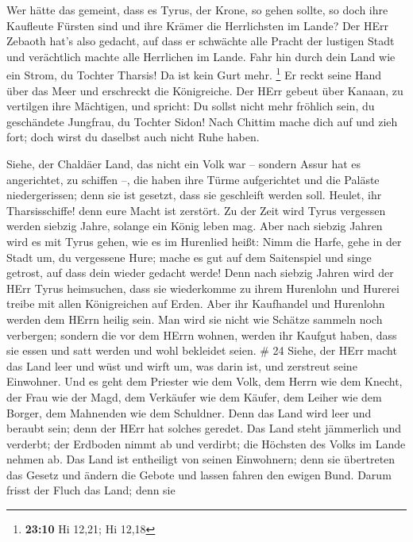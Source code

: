  Wer hätte das gemeint, dass es Tyrus, der Krone, so gehen
sollte, so doch ihre Kaufleute Fürsten sind und ihre Krämer die
Herrlichsten im Lande?  Der HErr Zebaoth hat's also gedacht,
auf dass er schwächte alle Pracht der lustigen Stadt und verächtlich
machte alle Herrlichen im Lande.  Fahr hin durch dein Land
wie ein Strom, du Tochter Tharsis! Da ist kein Gurt mehr. \footnote{\textbf{23:10}
  Hi 12,21; Hi 12,18}  Er reckt seine Hand über das Meer
und erschreckt die Königreiche. Der HErr gebeut über Kanaan, zu
vertilgen ihre Mächtigen,  und spricht: Du sollst nicht
mehr fröhlich sein, du geschändete Jungfrau, du Tochter Sidon! Nach
Chittim mache dich auf und zieh fort; doch wirst du daselbst auch nicht
Ruhe haben.

 Siehe, der Chaldäer Land, das nicht ein Volk war --
sondern Assur hat es angerichtet, zu schiffen --, die haben ihre Türme
aufgerichtet und die Paläste niedergerissen; denn sie ist gesetzt, dass
sie geschleift werden soll.  Heulet, ihr Tharsisschiffe!
denn eure Macht ist zerstört.  Zu der Zeit wird Tyrus
vergessen werden siebzig Jahre, solange ein König leben mag. Aber nach
siebzig Jahren wird es mit Tyrus gehen, wie es im Hurenlied heißt:
 Nimm die Harfe, gehe in der Stadt um, du vergessene Hure;
mache es gut auf dem Saitenspiel und singe getrost, auf dass dein wieder
gedacht werde!  Denn nach siebzig Jahren wird der HErr
Tyrus heimsuchen, dass sie wiederkomme zu ihrem Hurenlohn und Hurerei
treibe mit allen Königreichen auf Erden.  Aber ihr
Kaufhandel und Hurenlohn werden dem HErrn heilig sein. Man wird sie
nicht wie Schätze sammeln noch verbergen; sondern die vor dem HErrn
wohnen, werden ihr Kaufgut haben, dass sie essen und satt werden und
wohl bekleidet seien. \# 24  Siehe, der HErr macht das Land
leer und wüst und wirft um, was darin ist, und zerstreut seine
Einwohner.  Und es geht dem Priester wie dem Volk, dem Herrn
wie dem Knecht, der Frau wie der Magd, dem Verkäufer wie dem Käufer, dem
Leiher wie dem Borger, dem Mahnenden wie dem Schuldner. 
Denn das Land wird leer und beraubt sein; denn der HErr hat solches
geredet.  Das Land steht jämmerlich und verderbt; der
Erdboden nimmt ab und verdirbt; die Höchsten des Volks im Lande nehmen
ab.  Das Land ist entheiligt von seinen Einwohnern; denn sie
übertreten das Gesetz und ändern die Gebote und lassen fahren den ewigen
Bund.  Darum frisst der Fluch das Land; denn sie
